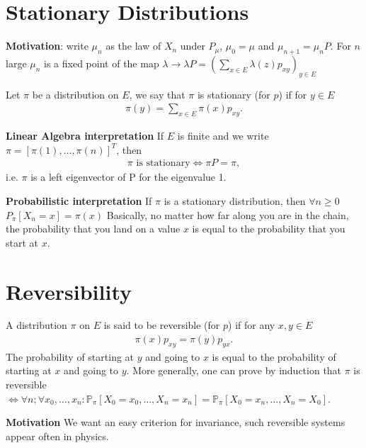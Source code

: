 \section{Stationary Distributions}
\textbf{Motivation}: write $\mu_{n}$ as the law of $X_{n}$ under $P_{\mu}$, $\mu_0=\mu$ and $\mu_{n+1}=\mu_{n}P$. For $n$ large $\mu_n$ is a fixed point of the map $\lambda \to \lambda P = \left( \sum_{x \in E} \lambda(z)p_{xy} \right)_{y \in E}$

\begin{defn}
	Let $\pi$ be a distribution on $E$, we say that $\pi$ is stationary (for $p$) if for $y \in E$
\begin{align}
	\boxed{ \pi(y) = \sum_{x \in E} \pi(x)p_{xy}}
.\end{align}

\textbf{Linear Algebra interpretation} If $E$ is finite and we write  $\pi = [\pi(1), \ldots ,\pi(n)]^T$, then 
\begin{align}
	\boxed{ \pi \textrm{ is stationary} \iff \pi P = \pi },
\end{align}
i.e. $\pi$ is a left eigenvector of P for the eigenvalue 1.

\textbf{Probabilistic interpretation} If $\pi $ is a stationary distribution, then $\forall n \geq 0$ $P_{\pi }[X_n =x] = \pi (x)$
\newline \indent
Basically, no matter how far along you are in the chain, the probability that you land on a value $x$ is equal to the probability that you start at $x$.
\end{defn}

\section{Reversibility}
\begin{defn}
	A distribution $\pi $ on $ E$ is said to be reversible (for $p$) if for any $x,y \in E$
\begin{align}
	\boxed{ \pi (x) p_{xy}= \pi (y)p_{yx} }.
\end{align}
The probability of starting at $y$ and going to $x$ is equal to the probability of starting at $x$ and going to $y$. More generally, one can prove by induction that $\pi $ is reversible $ \iff \forall n; \forall x_0, \ldots ,x_n: \mathbb{P}_{\pi } \left[ X_0=x_0, \ldots ,X_n=x_n \right] = \mathbb{P}_{\pi } \left[ X_0=x_n, \ldots ,X_n=X_0 \right] $.
\end{defn}

\textbf{Motivation} We want an easy criterion for invariance, such reversible systems appear often in physics.

